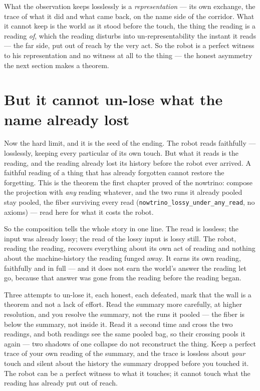 What the observation keeps losslessly is a \emph{representation} --- its own exchange, the trace of what it did and what
came back, on the name side of the corridor.
What it cannot keep is the world as it stood before the touch, the thing the reading is a reading \emph{of}, which the
reading disturbs into un-representability the instant it reads --- the far side, put out of reach by the very act.
So the robot is a perfect witness to his representation and no witness at all to the thing --- the honest asymmetry the
next section makes a theorem.

\section{But it cannot un-lose what the name already lost}

Now the hard limit, and it is the seed of the ending.
The robot reads faithfully --- losslessly, keeping every particular of its own touch.
But what it reads is the reading, and the reading already lost its history before the robot ever arrived.
A faithful reading of a thing that has already forgotten cannot restore the forgetting.
This is the theorem the first chapter proved of the nowtrino: compose the projection with \emph{any} reading whatever,
and the two runs it already pooled stay pooled, the fiber surviving every read
(\texttt{nowtrino\_lossy\_under\_any\_read}, no axioms) --- read here for what it costs the robot.

So the composition tells the whole story in one line.
The read is lossless; the input was already lossy; the read of the lossy input is lossy still.
The robot, reading the reading, recovers everything about its own act of reading and nothing about the machine-history the
reading funged away.
It earns its own reading, faithfully and in full --- and it does not earn the world's answer the reading let go, because
that answer was gone from the reading before the reading began.

Three attempts to un-lose it, each honest, each defeated, mark that the wall is a theorem and not a lack of effort.
Read the summary more carefully, at higher resolution, and you resolve the summary, not the runs it pooled --- the fiber is
below the summary, not inside it.
Read it a second time and cross the two readings, and both readings see the same pooled bag, so their crossing pools it
again --- two shadows of one collapse do not reconstruct the thing.
Keep a perfect trace of your own reading of the summary, and the trace is lossless about \emph{your} touch and silent
about the history the summary dropped before you touched it.
The robot can be a perfect witness to what it touches; it cannot touch what the reading has already put out of reach.

